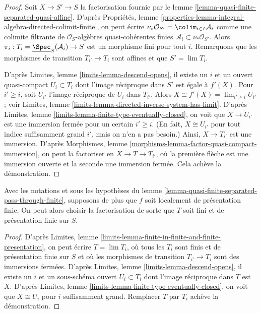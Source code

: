 \begin{proof}
Soit $X \to S' \to S$ la factorisation fournie par
le lemme \ref{lemma-quasi-finite-separated-quasi-affine}.
D'après
Propriétés, lemme
\ref{properties-lemma-integral-algebra-directed-colimit-finite},
on peut écrire
$\nu_*\mathcal{O}_{S'} = \colim_{i \in I} \mathcal{A}_i$ comme une
colimite filtrante de $\mathcal{O}_S$-algèbres quasi-cohérentes finies
$\mathcal{A}_i \subset \nu_*\mathcal{O}_{S'}$. Alors
$\pi_i : T_i = \underline{\Spec}_S(\mathcal{A}_i) \to S$
est un morphisme fini pour tout $i$.
Remarquons que les morphismes de transition $T_{i'} \to T_i$ sont affines
et que $S' = \lim T_i$.

\medskip\noindent
D'après Limites, lemme \ref{limits-lemma-descend-opens},
il existe un $i$ et un ouvert quasi-compact
$U_i \subset T_i$ dont l'image réciproque dans $S'$ est égale à
$f'(X)$. Pour $i' \geq i$, soit $U_{i'}$ l'image réciproque
de $U_i$ dans $T_{i'}$. Alors $X \cong f'(X) = \lim_{i' \geq i} U_{i'}$ ; voir
Limites, lemme \ref{limits-lemma-directed-inverse-system-has-limit}.
D'après Limites, lemme \ref{limits-lemma-finite-type-eventually-closed},
on voit que $X \to U_{i'}$ est une immersion fermée pour un certain $i' \geq i$.
(En fait, $X \cong U_{i'}$ pour tout indice suffisamment
grand $i'$, mais on n'en a pas besoin.) Ainsi, $X \to T_{i'}$ est une immersion. D'après
Morphismes, lemme \ref{morphisms-lemma-factor-quasi-compact-immersion},
on peut la factoriser en $X \to T \to T_{i'}$, où la première flèche
est une immersion ouverte et la seconde une immersion fermée. Cela achève la démonstration.
\end{proof}

\begin{lemma}
\label{lemma-quasi-finite-separated-pass-through-finite-addendum}
Avec les notations et sous les hypothèses du
lemme \ref{lemma-quasi-finite-separated-pass-through-finite},
supposons de plus que $f$ soit localement de présentation finie. On peut alors
choisir la factorisation de sorte que $T$ soit fini et de
présentation finie sur $S$.
\end{lemma}

\begin{proof}
D'après Limites, lemme
\ref{limits-lemma-finite-in-finite-and-finite-presentation}, on peut écrire
$T = \lim T_i$, où tous les $T_i$ sont finis et de présentation finie
sur $S$ et où les morphismes de transition $T_{i'} \to T_i$ sont des immersions
fermées. D'après
Limites, lemme \ref{limits-lemma-descend-opens},
il existe un $i$ et un sous-schéma ouvert $U_i \subset T_i$ dont l'image
réciproque dans $T$ est $X$. D'après
Limites, lemme
\ref{limits-lemma-finite-type-eventually-closed},
on voit que $X \cong U_i$ pour $i$ suffisamment grand.
Remplacer $T$ par $T_i$ achève la démonstration.
\end{proof}








